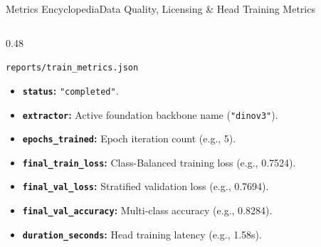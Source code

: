 \begin{frame}{Metrics Encyclopedia}{Data Quality, Licensing \& Head Training Metrics}
\begin{columns}[T]
\begin{column}{0.48\textwidth}
\begin{block}{\texttt{reports/train\_metrics.json}}
\begin{itemize}
                    \item \textbf{\texttt{status}:} \texttt{"completed"}.
                    \item \textbf{\texttt{extractor}:} Active foundation backbone name (\texttt{"dinov3"}).
                    \item \textbf{\texttt{epochs\_trained}:} Epoch iteration count (e.g., 5).
                    \item \textbf{\texttt{final\_train\_loss}:} Class-Balanced training loss (e.g., 0.7524).
                    \item \textbf{\texttt{final\_val\_loss}:} Stratified validation loss (e.g., 0.7694).
                    \item \textbf{\texttt{final\_val\_accuracy}:} Multi-class accuracy (e.g., 0.8284).
                    \item \textbf{\texttt{duration\_seconds}:} Head training latency (e.g., 1.58s).
                \end{itemize}
            \end{block}
        \end{column}
    \end{columns}


\end{frame}

